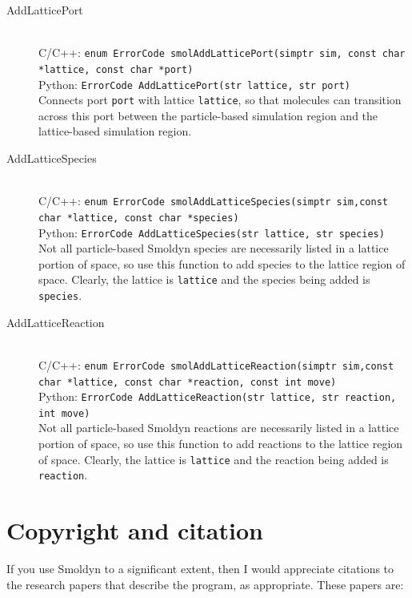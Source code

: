 \documentclass {scrbook}
\newcommand {\ttt} {\texttt}
\begin{document}
\begin{description}
\item[AddLatticePort]
\hfill \\
C/C++: \ttt{enum ErrorCode smolAddLatticePort(simptr sim, const char *lattice, const char *port)}\\
Python: \ttt{ErrorCode AddLatticePort(str lattice, str port)}\\
Connects port \ttt{port} with lattice \ttt{lattice}, so that molecules can transition across this port between the particle-based simulation region and the lattice-based simulation region.

\item[AddLatticeSpecies]
\hfill \\
C/C++: \ttt{enum ErrorCode smolAddLatticeSpecies(simptr sim,const char *lattice, const char *species)}\\
Python: \ttt{ErrorCode AddLatticeSpecies(str lattice, str species)}\\
Not all particle-based Smoldyn species are necessarily listed in a lattice portion of space, so use this function to add species to the lattice region of space. Clearly, the lattice is \ttt{lattice} and the species being added is \ttt{species}.

\item[AddLatticeReaction]
\hfill \\
C/C++: \ttt{enum ErrorCode smolAddLatticeReaction(simptr sim,const char *lattice, const char *reaction, const int move)}\\
Python: \ttt{ErrorCode AddLatticeReaction(str lattice, str reaction, int move)}\\
Not all particle-based Smoldyn reactions are necessarily listed in a lattice portion of space, so use this function to add reactions to the lattice region of space. Clearly, the lattice is \ttt{lattice} and the reaction being added is \ttt{reaction}.

\end{description}


\chapter{Copyright and citation}

If you use Smoldyn to a significant extent, then I would appreciate citations to the research papers that describe the program, as appropriate. These papers are:
\end{document}
